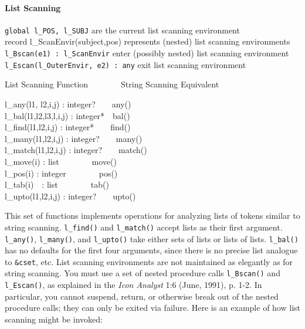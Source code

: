 \paragraph{List Scanning}
\texttt{global l\_POS, l\_SUBJ} are the current list scanning
environment\\
\textsf{record l\_ScanEnvir(subject,pos)} represents (nested) list
scanning environments\\
\texttt{l\_Bscan(e1) : l\_ScanEnvir} enter (possibly nested) list
scanning environment\\
\texttt{l\_Escan(l\_OuterEnvir, e2) : any} exit list scanning
environment

List Scanning Function\ \ \ \ \ \ \ \ String Scanning Equivalent

l\_any(l1, l2,i,j) : integer?\ \ \ \ any()\\
l\_bal(l1,l2,l3,l,i,j) : integer*\ \ bal()\\
l\_find(l1,l2,i,j) : integer*\ \ \ \ find()\\
l\_many(l1,l2,i,j) : integer?\ \ \ \ many()\\
l\_match(l1,l2,i,j) : integer?\ \ \ \ match()\\
l\_move(i) : list\ \ \ \ \ \ \ \ move()\\
l\_pos(i) : integer\ \ \ \ \ \ \ \ pos()\\
l\_tab(i)\ \ : list\ \ \ \ \ \ \ \ tab()\\
l\_upto(l1,l2,i,j) : integer?\ \ \ \ upto()

This set of functions implements operations for analyzing lists of
tokens similar to string scanning. \texttt{l\_find()} and
\texttt{l\_match()} accept lists as their first argument.
\texttt{l\_any()}, \texttt{l\_many()}, and \texttt{l\_upto()} take
either sets of lists or lists of lists. \texttt{l\_bal()} has no
defaults for the first four arguments, since there is no precise list
analogue to \texttt{\&cset}, etc. List scanning environments are not
maintained as elegantly as for string scanning. You must use a set of
nested procedure calls \texttt{l\_Bscan()} and \texttt{l\_Escan()}, as
explained in the \textit{Icon Analyst} 1:6 (June, 1991), p. 1-2. In
particular, you cannot suspend, return, or otherwise break out of the
nested procedure calls; they can only be exited via failure. Here is an
example of how list scanning might be invoked:


